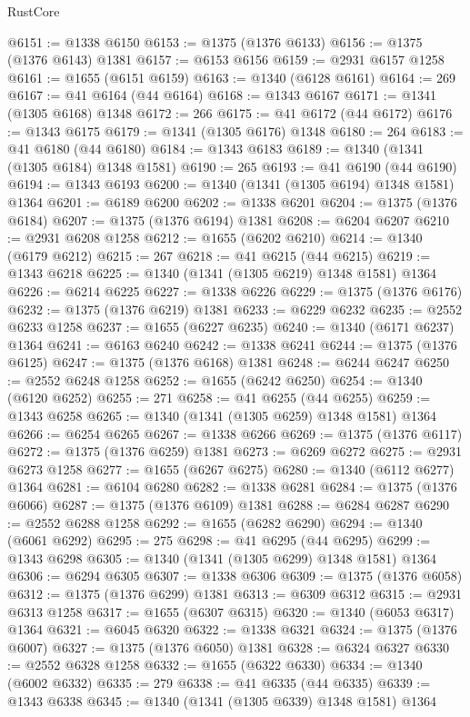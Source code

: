 \begin{lexlean}{RustCore}
\begin{coremodule}
@6151 := @1338 @6150
@6153 := @1375 (@1376 @6133)
@6156 := @1375 (@1376 @6143) @1381
@6157 := @6153 @6156
@6159 := @2931 @6157 @1258
@6161 := @1655 (@6151 @6159)
@6163 := @1340 (@6128 @6161)
@6164 := 269
@6167 := @41 @6164 (@44 @6164)
@6168 := @1343 @6167
@6171 := @1341 (@1305 @6168) @1348
@6172 := 266
@6175 := @41 @6172 (@44 @6172)
@6176 := @1343 @6175
@6179 := @1341 (@1305 @6176) @1348
@6180 := 264
@6183 := @41 @6180 (@44 @6180)
@6184 := @1343 @6183
@6189 := @1340 (@1341 (@1305 @6184) @1348 @1581)
@6190 := 265
@6193 := @41 @6190 (@44 @6190)
@6194 := @1343 @6193
@6200 := @1340 (@1341 (@1305 @6194) @1348 @1581) @1364
@6201 := @6189 @6200
@6202 := @1338 @6201
@6204 := @1375 (@1376 @6184)
@6207 := @1375 (@1376 @6194) @1381
@6208 := @6204 @6207
@6210 := @2931 @6208 @1258
@6212 := @1655 (@6202 @6210)
@6214 := @1340 (@6179 @6212)
@6215 := 267
@6218 := @41 @6215 (@44 @6215)
@6219 := @1343 @6218
@6225 := @1340 (@1341 (@1305 @6219) @1348 @1581) @1364
@6226 := @6214 @6225
@6227 := @1338 @6226
@6229 := @1375 (@1376 @6176)
@6232 := @1375 (@1376 @6219) @1381
@6233 := @6229 @6232
@6235 := @2552 @6233 @1258
@6237 := @1655 (@6227 @6235)
@6240 := @1340 (@6171 @6237) @1364
@6241 := @6163 @6240
@6242 := @1338 @6241
@6244 := @1375 (@1376 @6125)
@6247 := @1375 (@1376 @6168) @1381
@6248 := @6244 @6247
@6250 := @2552 @6248 @1258
@6252 := @1655 (@6242 @6250)
@6254 := @1340 (@6120 @6252)
@6255 := 271
@6258 := @41 @6255 (@44 @6255)
@6259 := @1343 @6258
@6265 := @1340 (@1341 (@1305 @6259) @1348 @1581) @1364
@6266 := @6254 @6265
@6267 := @1338 @6266
@6269 := @1375 (@1376 @6117)
@6272 := @1375 (@1376 @6259) @1381
@6273 := @6269 @6272
@6275 := @2931 @6273 @1258
@6277 := @1655 (@6267 @6275)
@6280 := @1340 (@6112 @6277) @1364
@6281 := @6104 @6280
@6282 := @1338 @6281
@6284 := @1375 (@1376 @6066)
@6287 := @1375 (@1376 @6109) @1381
@6288 := @6284 @6287
@6290 := @2552 @6288 @1258
@6292 := @1655 (@6282 @6290)
@6294 := @1340 (@6061 @6292)
@6295 := 275
@6298 := @41 @6295 (@44 @6295)
@6299 := @1343 @6298
@6305 := @1340 (@1341 (@1305 @6299) @1348 @1581) @1364
@6306 := @6294 @6305
@6307 := @1338 @6306
@6309 := @1375 (@1376 @6058)
@6312 := @1375 (@1376 @6299) @1381
@6313 := @6309 @6312
@6315 := @2931 @6313 @1258
@6317 := @1655 (@6307 @6315)
@6320 := @1340 (@6053 @6317) @1364
@6321 := @6045 @6320
@6322 := @1338 @6321
@6324 := @1375 (@1376 @6007)
@6327 := @1375 (@1376 @6050) @1381
@6328 := @6324 @6327
@6330 := @2552 @6328 @1258
@6332 := @1655 (@6322 @6330)
@6334 := @1340 (@6002 @6332)
@6335 := 279
@6338 := @41 @6335 (@44 @6335)
@6339 := @1343 @6338
@6345 := @1340 (@1341 (@1305 @6339) @1348 @1581) @1364

\end{coremodule}
\end{lexlean}
